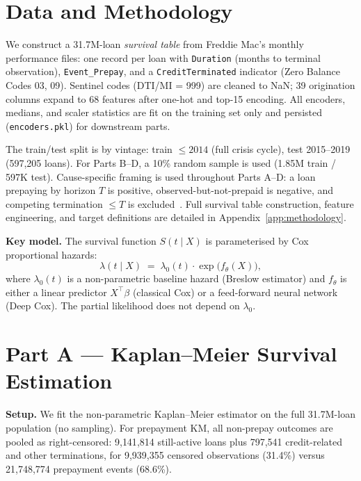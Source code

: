 \documentclass[11pt,a4paper]{article}
\begin{document}
\section{Data and Methodology}

We construct a 31.7M-loan \emph{survival table} from Freddie Mac's monthly performance files: one record per loan with \texttt{Duration} (months to terminal observation), \texttt{Event\_Prepay}, and a \texttt{CreditTerminated} indicator (Zero Balance Codes 03, 09). Sentinel codes (DTI/MI = 999) are cleaned to NaN; 39 origination columns expand to 68 features after one-hot and top-15 encoding. All encoders, medians, and scaler statistics are fit on the training set only and persisted (\texttt{encoders.pkl}) for downstream parts.

The train/test split is by vintage: train $\leq 2014$ (full crisis cycle), test 2015--2019 (597{,}205 loans). For Parts B--D, a 10\% random sample is used (1.85M train / 597K test). Cause-specific framing is used throughout Parts A--D: a loan prepaying by horizon $T$ is positive, observed-but-not-prepaid is negative, and competing termination $\leq T$ is excluded~\cite{kalbfleischprentice}. Full survival table construction, feature engineering, and target definitions are detailed in Appendix~\ref{app:methodology}.

\textbf{Key model.} The survival function $S(t \mid X)$ is parameterised by Cox proportional hazards:
\begin{equation}
  \lambda(t \mid X) \;=\; \lambda_0(t) \cdot \exp\!\bigl(f_\theta(X)\bigr),
  \label{eq:cox}
\end{equation}
where $\lambda_0(t)$ is a non-parametric baseline hazard (Breslow estimator) and $f_\theta$ is either a linear predictor $X^\top \beta$ (classical Cox) or a feed-forward neural network (Deep Cox). The partial likelihood does not depend on $\lambda_0$.

\section{Part A --- Kaplan--Meier Survival Estimation}

\textbf{Setup.} We fit the non-parametric Kaplan--Meier estimator on the full 31.7M-loan population (no sampling). For prepayment KM, all non-prepay outcomes are pooled as right-censored: 9{,}141{,}814 still-active loans plus 797{,}541 credit-related and other terminations, for 9{,}939{,}355 censored observations (31.4\%) versus 21{,}748{,}774 prepayment events (68.6\%).
\end{document}
